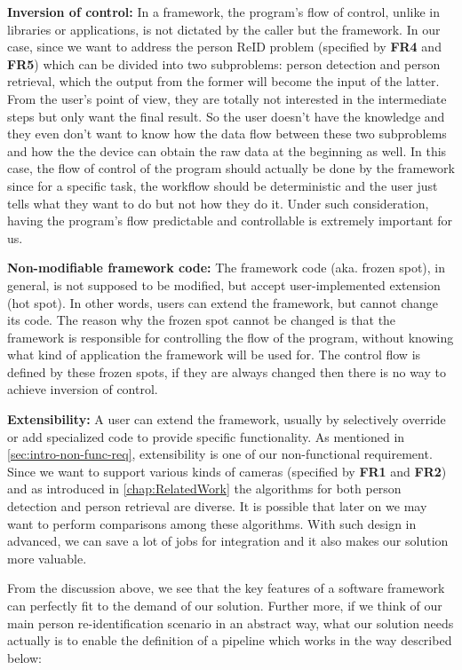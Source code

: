 \noindent \textbf{Inversion of control:}
In a framework, the program's flow of control, unlike in libraries or
applications, is not dictated by the caller but the framework.
%
In our case, since we want to address the person ReID problem (specified by
\textbf{FR4} and \textbf{FR5}) which can be
divided into two subproblems: person detection and person retrieval, which
the output from the former will become the input of the latter. From the user's
point of view, they are totally not interested in the intermediate steps but
only want the final result. So the user doesn't have the knowledge and they even
don't want to know how the data flow between these two subproblems and how the
the device can obtain the raw data at the beginning as well.
In this case, the flow of control of the program should actually be done
by the framework since for a specific task, the workflow should be 
deterministic and the user just tells what they want to do but not how they do 
it. Under such consideration, having the program's flow predictable and 
controllable is extremely important for us.

\noindent \textbf{Non-modifiable framework code:}
The framework code (aka. frozen spot), in general, is not supposed to be
modified, but accept user-implemented extension (hot spot). In other
words, users can extend the framework, but cannot change its code.
The reason why the frozen spot cannot be changed is that the framework is
responsible for controlling the flow of the program, without knowing what
kind of application the framework will be used for. The control flow is defined
by these frozen spots, if they are always changed then there is no way to
achieve inversion of control.

\noindent \textbf{Extensibility:}
A user can extend the framework, usually by selectively override or add
specialized code to provide specific functionality.
As mentioned in \autoref{sec:intro-non-func-req}, extensibility is one of our
non-functional requirement. Since we want to support various kinds of cameras
(specified by \textbf{FR1} and \textbf{FR2})
and as introduced in \autoref{chap:RelatedWork} the algorithms for both person
detection and person retrieval are diverse. It is possible that later on we may
want to perform comparisons among these algorithms. With such design in 
advanced, we can save a lot of jobs for integration and it also makes our 
solution more valuable.

From the discussion above, we see that the key features of a software
framework can perfectly fit to the demand of our solution. Further more,
if we think of our main person re-identification scenario in an abstract way,
what our solution needs actually is to enable the definition of a pipeline 
which works in the way described below:

